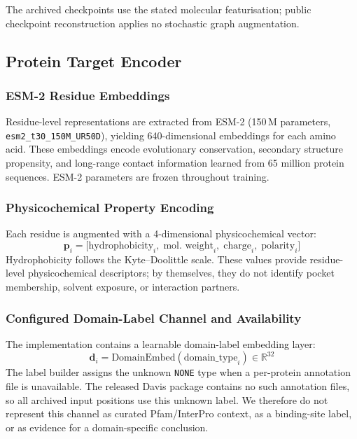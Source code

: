 \documentclass[fleqn,10pt]{wlscirep}
\begin{document}
The archived checkpoints use the stated molecular featurisation; public
checkpoint reconstruction applies no stochastic graph augmentation.

\subsection{Protein Target Encoder}

\subsubsection{ESM-2 Residue Embeddings}

Residue-level representations are extracted from ESM-2 (150\,M parameters,
\texttt{esm2\_t30\_150M\_UR50D}),\cite{lin2023evolutionary} yielding
640-dimensional embeddings for each amino acid.  These embeddings encode
evolutionary conservation, secondary structure propensity, and long-range contact
information learned from 65 million protein sequences.  ESM-2 parameters are
frozen throughout training.

\subsubsection{Physicochemical Property Encoding}

Each residue is augmented with a 4-dimensional physicochemical vector:
\begin{equation}
\mathbf{p}_i = \bigl[\text{hydrophobicity}_i,\;\text{mol.\ weight}_i,\;
  \text{charge}_i,\;\text{polarity}_i\bigr]
\end{equation}
Hydrophobicity follows the Kyte--Doolittle scale.\cite{kyte1982simple}
These values provide residue-level physicochemical descriptors; by themselves,
they do not identify pocket membership, solvent exposure, or interaction
partners.

\subsubsection{Configured Domain-Label Channel and Availability}

The implementation contains a learnable domain-label embedding layer:
\begin{equation}
\mathbf{d}_i = \mathrm{DomainEmbed}(\text{domain\_type}_i) \in \mathbb{R}^{32}
\end{equation}
The label builder assigns the unknown \texttt{NONE} type when a per-protein
annotation file is unavailable. The released Davis package contains no such
annotation files, so all archived input positions use this unknown label. We
therefore do not represent this channel as curated Pfam/InterPro context, as a
binding-site label, or as evidence for a domain-specific conclusion.
\end{document}
